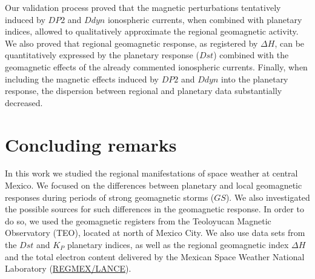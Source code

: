\documentclass[a4paper,fleqn]{cas-dc}
\begin{document}
Our validation process proved that the magnetic perturbations tentatively induced by $DP2$ and $Ddyn$ ionospheric currents, when combined with planetary indices, allowed to qualitatively approximate the regional geomagnetic activity. We also proved that regional geomagnetic response, as registered by $\Delta H$, can be quantitatively expressed by the planetary response ($Dst$) combined with the geomagnetic effects of the already commented ionospheric currents. Finally, when including the magnetic effects induced by $DP2$ and $Ddyn$ into the planetary response, the dispersion between regional and planetary data substantially decreased.






\section{Concluding remarks}

In this work we studied the regional manifestations of space weather at central Mexico. We focused on the differences between planetary and local geomagnetic responses during periods of strong geomagnetic storms ($GS$). We also investigated the possible sources for such differences in the geomagnetic response. In order to do so, we used the geomagnetic registers from the Teoloyucan Magnetic Observatory (TEO), located at north of Mexico City. We also use data sets from the $Dst$ and $K_P$ planetary indices, as well as the regional geomagnetic index $\Delta H$ and the total electron content delivered by the Mexican Space Weather National Laboratory (\href{http://regmex.unam.mx}{REGMEX/LANCE}).
\end{document}
